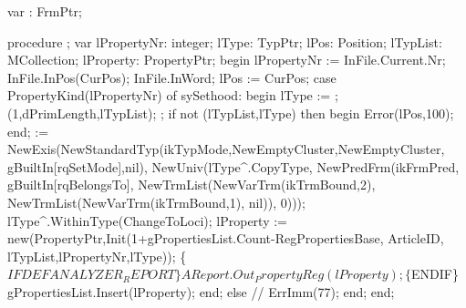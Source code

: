 \nwenddocs{}\endmoddef\nwstartdeflinemarkup{}\nwenddeflinemarkup
var : FrmPtr;

procedure ;
var
   lPropertyNr: integer;
   lType: TypPtr;
   lPos: Position;
   lTypList: MCollection;
   lProperty: PropertyPtr;
begin
   lPropertyNr := InFile.Current.Nr;
   InFile.InPos(CurPos); InFile.InWord;
   lPos := CurPos;
   case PropertyKind(lPropertyNr) of
      sySethood:
         begin
            lType := ;
            (1,dPrimLength,lTypList);
            ;
            if not (lTypList,lType) then
            begin
               Error(lPos,100);
            end;
             := NewExis(NewStandardTyp(ikTypMode,NewEmptyCluster,NewEmptyCluster,
                                                    gBuiltIn[rqSetMode],nil),
                                     NewUniv(lType^.CopyType,
                                             NewPredFrm(ikFrmPred,
                                                        gBuiltIn[rqBelongsTo],
                                                        NewTrmList(NewVarTrm(ikTrmBound,2),
                                                                   NewTrmList(NewVarTrm(ikTrmBound,1),
                                                                              nil)),
                                                        0)));
            lType^.WithinType(ChangeToLoci);
            lProperty := new(PropertyPtr,Init(1+gPropertiesList.Count-RegPropertiesBase, ArticleID,
                                              lTypList,lPropertyNr,lType));
            \{$IFDEF ANALYZER_REPORT\}
            AReport.Out_PropertyReg(lProperty);
            \{$ENDIF\}
            gPropertiesList.Insert(lProperty);
         end;
   else
      //   ErrImm(77);
   end;
end;
\eatline

